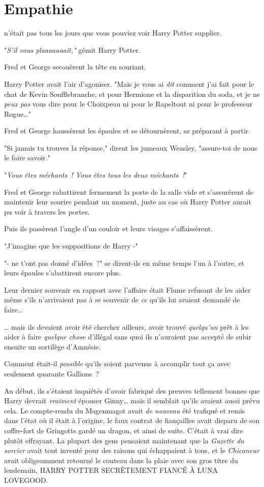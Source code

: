 \chapter{Empathie}

 n'était pas tous les jours que vous pouviez voir Harry Potter supplier.

\hplettrineextrapara
"\emph{S'il vous plaaaaaaaît,"} gémit Harry Potter.

Fred et George secouèrent la tête en souriant.

Harry Potter avait l'air d'agoniser. "Mais je vous ai \emph{dit} comment j'ai fait pour le chat de Kevin Soufflebranche, et pour Hermione et la disparition du soda, et je ne \emph{peux pas} vous dire pour le Choixpeau ni pour le Rapeltout ni pour le professeur Rogue…"

Fred et George haussèrent les épaules et se détournèrent, se préparant à partir.

"Si jamais tu trouves la réponse," dirent les jumeaux Weasley, "assure-toi de nous le faire savoir."

"\emph{Vous êtes méchants~! Vous êtes tous les deux méchants~!}"

Fred et George rabattirent fermement la porte de la salle vide et s'assurèrent de maintenir leur sourire pendant un moment, juste au cas où Harry Potter aurait pu voir à travers les portes.

Puis ils passèrent l'angle d'un couloir et leurs visages s'affaissèrent.

"J'imagine que les suppositions de Harry -"

"- ne t'ont pas donné d'idées~?" se dirent-ils en même temps l'un à l'autre, et leurs épaules s'abattirent encore plus.

Leur dernier souvenir en rapport avec l'affaire était Flume refusant de les aider même s'ils n'arrivaient pas à se souvenir de \emph{ce} qu'ils lui avaient demandé de faire…

… mais ils devaient avoir été chercher ailleurs, avoir trouvé \emph{quelqu'un} prêt à les aider à faire \emph{quelque chose} d'illégal sans quoi ils n'auraient pas accepté de subir ensuite un sortilège d'Amnésie.

Comment était-il \emph{possible} qu'ils soient parvenus à accomplir tout ça avec seulement quarante Gallions~?

Au début, ils s'étaient inquiétés d'avoir fabriqué des preuves tellement bonnes que Harry devrait \emph{vraiment} épouser Ginny… mais il semblait qu'ils avaient aussi prévu cela. Le compte-rendu du Magenmagot avait \emph{de nouveau} été trafiqué et remis dans l'état où il était à l'origine, le faux contrat de fiançailles avait disparu de son coffre-fort de Gringotts gardé un dragon, et ainsi de suite. C'était à vrai dire plutôt effrayant. La plupart des gens pensaient maintenant que la \emph{Gazette du sorcier} avait tout inventé pour des raisons qui échappaient à tous, et le \emph{Chicaneur} avait obligeamment retourné le couteau dans la plaie avec son gros titre du lendemain, HARRY POTTER SECRÈTEMENT FIANCÉ À LUNA LOVEGOOD.


